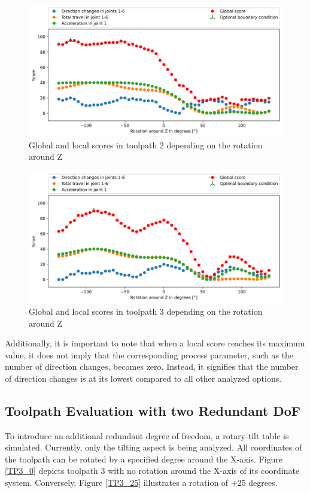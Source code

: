 \begin{figure}[H]
\centerline{\includegraphics[width=1\textwidth]{figures/best_c_2_combi.png}}
\caption{Global and local scores in toolpath 2 depending on the rotation around Z}
\label{TP2_combi}
\end{figure}
\begin{figure}[H]
\centerline{\includegraphics[width=1\textwidth]{figures/best_c_3_combi.png}}
\caption{Global and local scores in toolpath 3 depending on the rotation around Z}
\label{TP3_combi}
\end{figure}

Additionally, it is important to note that when a local score reaches its maximum value, it does not imply that the corresponding process parameter, such as the number of direction changes, becomes zero. Instead, it signifies that the number of direction changes is at its lowest compared to all other analyzed options.

\subsection{Toolpath Evaluation with two Redundant DoF}\label{2RDOF}

To introduce an additional redundant degree of freedom, a rotary-tilt table is simulated. Currently, only the tilting aspect is being analyzed. All coordinates of the toolpath can be rotated by a specified degree around the X-axis. Figure \ref{TP3_0} depicts toolpath 3 with no rotation around the X-axis of its coordinate system. Conversely, Figure \ref{TP3_25} illustrates a rotation of +25 degrees.

